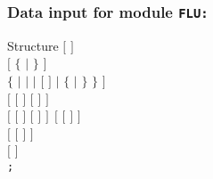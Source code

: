 \clearpage

\subsubsection{Data input for module {\tt FLU:}}\label{sect:descflu}

\begin{DataStructure}{Structure }
$[$   $]$ \\
$[$   $\{$  $|$  $\}$ $]$ \\
 $\{$  $|$  $|$  $|$  $[$  $]$ $|$ 
$\{$ $|$  $\}$  $\}$ $]$  \\
$[$   $[$  $]$  $[$  $]$  $]$ \\
$[$   $[$  $]$  $[$  $]$  $]~~[$   $[$  $]$  $]$ \\
$[$   $[$  $]$  $]$ \\
$[$       $]$ \\
{\tt ;}
\end{DataStructure}

